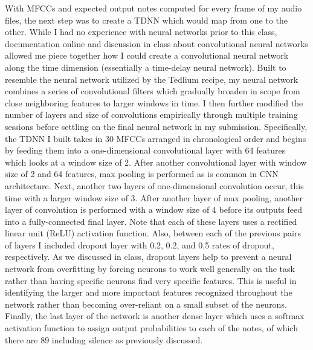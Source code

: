\documentclass[conference]{IEEEtran}
\begin{document}
With MFCCs and expected output notes computed for every frame of my audio files, the next step was to create a TDNN which would map from one to the other. While I had no experience with neural networks prior to this class, documentation online and discussion in class about convolutional neural networks allowed me piece together how I could create a convolutional neural network along the time dimension (essentially a time-delay neural network). Built to resemble the neural network utilized by the Tedlium recipe, my neural network combines a series of convolutional filters which gradually broaden in scope from close neighboring features to larger windows in time. I then further modified the number of layers and size of convolutions empirically through multiple training sessions before settling on the final neural network in my submission. Specifically, the TDNN I built takes in 30 MFCCs arranged in chronological order and begins by feeding them into a one-dimensional convolutional layer with 64 features which looks at a window size of 2. After another convolutional layer with window size of 2 and 64 features, max pooling is performed as is common in CNN architecture. Next, another two layers of one-dimensional convolution occur, this time with a larger window size of 3. After another layer of max pooling, another layer of convolution is performed with a window size of 4 before its outputs feed into a fully-connected final layer. Note that each of these layers uses a rectified linear unit (ReLU) activation function. Also, between each of the previous pairs of layers I included dropout layer with 0.2, 0.2, and 0.5 rates of dropout, respectively. As we discussed in class, dropout layers help to prevent a neural network from overfitting by forcing neurons to work well generally on the task rather than having specific neurons find very specific features. This is useful in identifying the larger and more important features recognized throughout the network rather than becoming over-reliant on a small subset of the neurons. Finally, the last layer of the network is another dense layer which uses a softmax activation function to assign output probabilities to each of the notes, of which there are 89 including silence as previously discussed.
\end{document}
